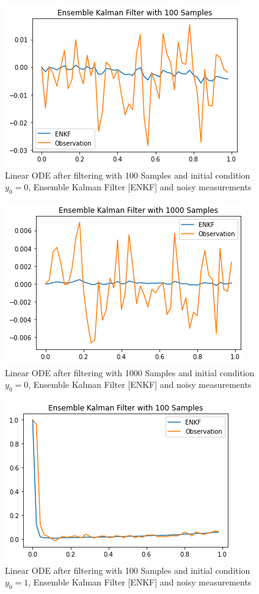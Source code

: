 \documentclass{article}
\begin{document}
\begin{figure}[!ht]
\centering
    \includegraphics{M100.png}
    \caption{Linear ODE after filtering with 100 Samples and initial condition $y_0=0$, Ensemble Kalman Filter [ENKF] and noisy measurements}
    \label{fig:DGL_EF2}
\end{figure}

\begin{figure}[!ht]
\centering
    \includegraphics{M1000.png}
    \caption{Linear ODE after filtering with 1000 Samples and initial condition $y_0=0$, Ensemble Kalman Filter [ENKF] and noisy measurements}
    \label{fig:DGL_EF2}
\end{figure}


\begin{figure}[!ht]
\centering
    \includegraphics{M100_positive.png}
    \caption{Linear ODE after filtering with 100 Samples and initial condition $y_0=1$, Ensemble Kalman Filter [ENKF] and noisy measurements}
    \label{fig:DGL_EF3}
\end{figure}
\end{document}
